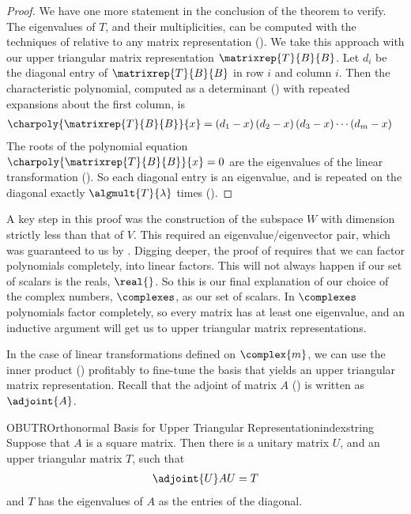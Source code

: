 \begin{proof}
%
We have one more statement in the conclusion of the theorem to verify.  The eigenvalues of $T$, and their multiplicities, can be computed with the techniques of  relative to any matrix representation (). We take this approach with our upper triangular matrix representation $\matrixrep{T}{B}{B}$.  Let $d_i$ be the diagonal entry of $\matrixrep{T}{B}{B}$ in row $i$ and column $i$.  Then the characteristic polynomial, computed as a determinant () with repeated expansions about the first column, is
%
\begin{align*}
\charpoly{\matrixrep{T}{B}{B}}{x}&=
\left(d_1-x\right)
\left(d_2-x\right)
\left(d_3-x\right)
\cdots
\left(d_m-x\right)
\end{align*}
%
The roots of the polynomial equation $\charpoly{\matrixrep{T}{B}{B}}{x}=0$ are the eigenvalues of the linear transformation ().  So each diagonal entry is an eigenvalue, and is repeated on the diagonal exactly $\algmult{T}{\lambda}$ times ().
%
\end{proof}
%
A key step in this proof was the construction of the subspace $W$ with dimension strictly less than that of $V$.  This required an eigenvalue/eigenvector pair, which was guaranteed to us by .  Digging deeper, the proof of  requires that we can factor polynomials completely, into linear factors.  This will not always happen if our set of scalars is the reals, $\real{\null}$.  So this is our final explanation of our choice of the complex numbers, $\complexes$, as our set of scalars.  In $\complexes$ polynomials factor completely, so every matrix has at least one eigenvalue, and an inductive argument will get us to upper triangular matrix representations.\par
%
In the case of linear transformations defined on $\complex{m}$, we can use the inner product () profitably to fine-tune the basis that yields an upper triangular matrix representation.  Recall that the adjoint of matrix $A$ () is written as $\adjoint{A}$.
%
\begin{theorem}{OBUTR}{Orthonormal Basis for Upper Triangular Representation}{indexstring}
Suppose that $A$ is a square matrix.  Then there is a unitary matrix $U$, and an upper triangular matrix $T$, such that
%
\begin{align*}
\adjoint{U}AU=T
\end{align*}
%
and $T$ has the eigenvalues of $A$ as the entries of the diagonal.
\end{theorem}
